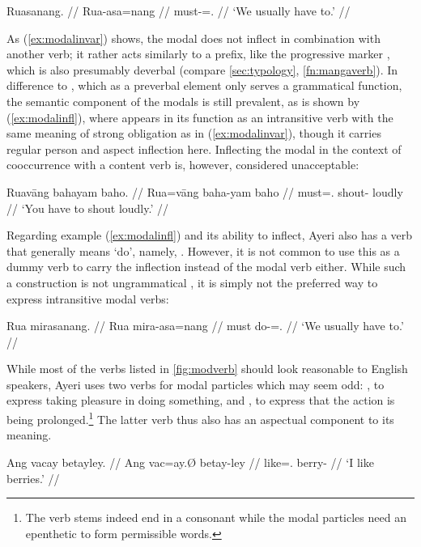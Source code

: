 \a\label{ex:modalinfl}\begingl
	\gla Ruasanang. //
	\glb Rua-asa=nang //
	\glc must-\Hab{}=\Fpl{}.\Aarg{} //
	\glft `We usually have to.' //
\endgl

\xe

As (\ref{ex:modalinvar}) shows, the modal does not inflect in combination with 
another verb; it rather acts similarly to a prefix, like the progressive marker 
, which is also presumably deverbal (compare 
\autoref{sec:typology}, \autoref{fn:mangaverb}). In difference to 
, which as a preverbal element only serves a grammatical 
function, the semantic component of the modals is still prevalent, as is shown 
by (\ref{ex:modalinfl}), where  appears in its function as 
an intransitive verb with the same meaning of strong obligation as in 
(\ref{ex:modalinvar}), though it carries regular person and aspect inflection 
here. Inflecting the modal in the context of cooccurrence with a content verb 
is, however, considered unacceptable:

\ex\ljudge*\begingl
	\gla Ruavāng bahayam baho. //
	\glb Rua=vāng baha-yam baho //
	\glc must=\Ssg{}.\AgtT{} shout-\Ptcp{} loudly //
	\glft `You have to shout loudly.' //
\endgl\xe

Regarding example (\ref{ex:modalinfl}) and its ability to inflect, Ayeri 
also has a verb that generally means `do', namely, . However, 
it is not common to use this as a dummy verb to carry the inflection instead of 
the modal verb either. While such a construction is not ungrammatical , it is simply not the preferred way to express intransitive modal verbs:

\ex\ljudge\ques\begingl
	\gla Rua mirasanang. //
	\glb Rua mira-asa=nang //
	\glc must do-\Hab{}=\Fpl{}.\Aarg{} //
	\glft `We usually have to.' //
\endgl\xe

While most of the verbs listed in \autoref{fig:modverb} should look 
reasonable to English speakers, Ayeri uses two verbs for modal particles which 
may seem odd: , to express taking pleasure in doing 
something, and , to express that the action is 
being prolonged.\footnote{The verb stems indeed end in a consonant while the 
modal particles need an epenthetic  to form permissible words.} The 
latter verb thus also has an aspectual component to its meaning.

\pex\label{ex:vacvaca}
\a\label{ex:vacfull}\begingl
	\gla Ang vacay betayley. //
	\glb Ang vac=ay.Ø betay-ley //
	\glc \AgtT{} like=\Fsg{}.\Top{} berry-\PargI{} //
	\glft `I like berries.' //
\endgl

